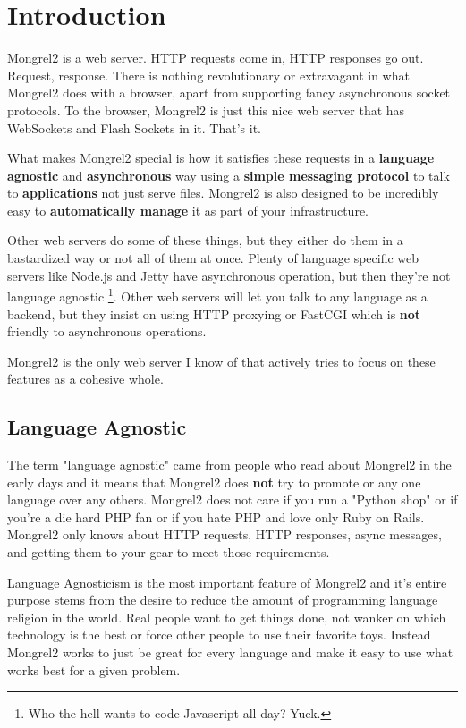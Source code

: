 \chapter{Introduction}

Mongrel2 is a web server.  HTTP requests come in, HTTP responses go out.
Request, response.  There is nothing revolutionary or extravagant in what
Mongrel2 does with a browser, apart from supporting fancy asynchronous socket
protocols.  To the browser, Mongrel2 is just this nice web server that has
WebSockets and Flash Sockets in it.  That's it.

What makes Mongrel2 special is how it satisfies these requests in a {\bf
language agnostic} and {\bf asynchronous} way using a {\bf simple messaging
protocol} to talk to {\bf applications} not just serve files.  Mongrel2 is also
designed to be incredibly easy to {\bf automatically manage} it as part of your
infrastructure.

Other web servers do some of these things, but they either do them in a bastardized
way or not all of them at once.  Plenty of language specific web servers like Node.js
and Jetty have asynchronous operation, but then they're not language agnostic
\footnote{Who the hell wants to code Javascript all day?  Yuck.}.  Other web servers
will let you talk to any language as a backend, but they insist on using HTTP
proxying or FastCGI which is {\bf not} friendly to asynchronous operations.

Mongrel2 is the only web server I know of that actively tries to focus on these
features as a cohesive whole.


\section{Language Agnostic}

The term "language agnostic" came from people who read about Mongrel2 in the
early days and it means that Mongrel2 does {\bf not} try to promote or any one
language over any others.  Mongrel2 does not care if you run a "Python shop" or
if you're a die hard PHP fan or if you hate PHP and love only Ruby on Rails.
Mongrel2 only knows about HTTP requests, HTTP responses, async messages, and
getting them to your gear to meet those requirements.

Language Agnosticism is the most important feature of Mongrel2 and it's entire
purpose stems from the desire to reduce the amount of programming language 
religion in the world.  Real people want to get things done, not wanker on 
which technology is the best or force other people to use their favorite toys.
Instead Mongrel2 works to just be great for every language and make it easy
to use what works best for a given problem.


